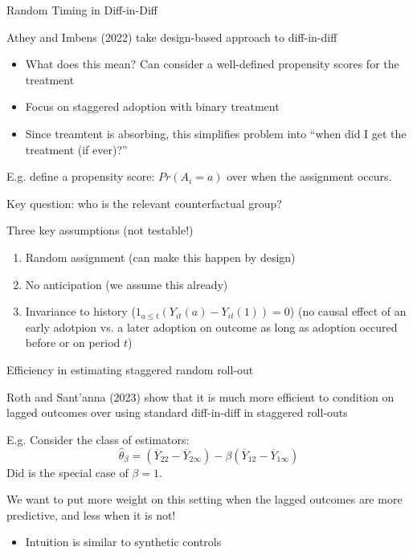 \documentclass[notes,11pt, aspectratio=169]{beamer}
\newenvironment{wideitemize}{\itemize\addtolength{\itemsep}{10pt}}{\enditemize}
\begin{document}
\begin{frame}{Random Timing in Diff-in-Diff}
  \begin{wideitemize}
  \item Athey and Imbens (2022) take design-based approach to diff-in-diff
    \begin{itemize}
    \item What does this mean? Can consider a well-defined propensity scores for the treatment
    \item Focus on staggered adoption with binary treatment
    \item Since treamtent is absorbing, this simplifies problem into ``when did I get the treatment (if ever)?''
    \end{itemize}
  \item E.g. define a propensity score: $Pr(A_{i} = a)$ over when the assignment occurs.
  \item Key question: who is the relevant counterfactual group?
  \end{wideitemize}
\end{frame}

\begin{frame}{Three key assumptions (not testable!)}
  \begin{enumerate}
  \item Random assignment (can make this happen by design)
  \item No anticipation (we assume this already)
  \item Invariance to history
    ($1_{a \leq t}(Y_{it}(a) - Y_{it}(1)) = 0$) (no causal effect of
    an early adotpion vs. a later adoption on outcome as long as
    adoption occured before or on period $t$)
  \end{enumerate}
\end{frame}

\begin{frame}{Efficiency in estimating staggered random roll-out}
  \begin{wideitemize}
  \item Roth and Sant'anna (2023) show that it is much more efficient
    to condition on lagged outcomes over using standard diff-in-diff
    in staggered roll-outs
  \item E.g. Consider the class of estimators:
    \begin{equation}
      \hat{\theta}_{\beta} = (\overline{Y}_{22} - \overline{Y}_{2\infty}) -  \beta(\overline{Y}_{12} - \overline{Y}_{1\infty})
    \end{equation}
    Did is the special case of $\beta=1$.
  \item We want to put more weight on this setting when the lagged
    outcomes are more predictive, and less when it is not!
    \begin{itemize}
    \item Intuition is similar to synthetic controls
    \end{itemize}
  \end{wideitemize}
\end{frame}
\end{document}
